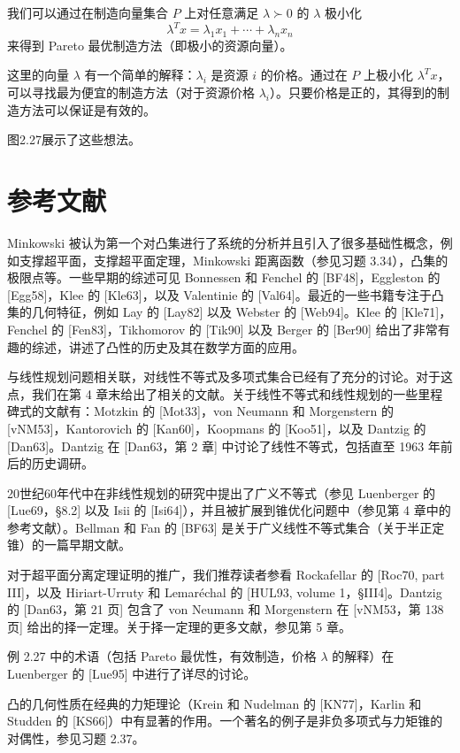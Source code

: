 \documentclass[UTF8,12pt,a4paper,fontset=fandol]{ctexart}
\begin{document}
我们可以通过在制造向量集合 $P$ 上对任意满足 $\lambda\succ0$ 的 $\lambda$ 极小化
\[
  \lambda^Tx=\lambda_1x_1+\cdots+\lambda_nx_n
\]
来得到 Pareto 最优制造方法（即极小的资源向量）。

这里的向量 $\lambda$ 有一个简单的解释：$\lambda_i$ 是资源 $i$ 的价格。通过在 $P$ 上极小化 $\lambda^Tx$，可以寻找最为便宜的制造方法（对于资源价格 $\lambda_i$）。只要价格是正的，其得到的制造方法可以保证是有效的。

图2.27展示了这些想法。

\section*{参考文献}

Minkowski 被认为第一个对凸集进行了系统的分析并且引入了很多基础性概念，例如支撑超平面，支撑超平面定理，Minkowski 距离函数（参见习题 3.34），凸集的极限点等。一些早期的综述可见 Bonnessen 和 Fenchel 的 [BF48]，Eggleston 的 [Egg58]，Klee 的 [Kle63]，以及 Valentinie 的 [Val64]。最近的一些书籍专注于凸集的几何特征，例如 Lay 的 [Lay82] 以及 Webster 的 [Web94]。Klee 的 [Kle71]，Fenchel 的 [Fen83]，Tikhomorov 的 [Tik90] 以及 Berger 的 [Ber90] 给出了非常有趣的综述，讲述了凸性的历史及其在数学方面的应用。

与线性规划问题相关联，对线性不等式及多项式集合已经有了充分的讨论。对于这点，我们在第 4 章末给出了相关的文献。关于线性不等式和线性规划的一些里程碑式的文献有：Motzkin 的 [Mot33]，von Neumann 和 Morgenstern 的 [vNM53]，Kantorovich 的 [Kan60]，Koopmans 的 [Koo51]，以及 Dantzig 的 [Dan63]。Dantzig 在 [Dan63，第 2 章] 中讨论了线性不等式，包括直至 1963 年前后的历史调研。

20世纪60年代中在非线性规划的研究中提出了广义不等式（参见 Luenberger 的 [Lue69，§8.2] 以及 Isii 的 [Isi64]），并且被扩展到锥优化问题中（参见第 4 章中的参考文献）。Bellman 和 Fan 的 [BF63] 是关于广义线性不等式集合（关于半正定锥）的一篇早期文献。

对于超平面分离定理证明的推广，我们推荐读者参看 Rockafellar 的 [Roc70, part III]，以及 Hiriart-Urruty 和 Lemaréchal 的 [HUL93, volume 1，§III4]。Dantzig 的 [Dan63，第 21 页] 包含了 von Neumann 和 Morgenstern 在 [vNM53，第 138 页] 给出的择一定理。关于择一定理的更多文献，参见第 5 章。

例 2.27 中的术语（包括 Pareto 最优性，有效制造，价格 $\lambda$ 的解释）在 Luenberger 的 [Lue95] 中进行了详尽的讨论。

凸的几何性质在经典的力矩理论（Krein 和 Nudelman 的 [KN77]，Karlin 和 Studden 的 [KS66]）中有显著的作用。一个著名的例子是非负多项式与力矩锥的对偶性，参见习题 2.37。
\end{document}
